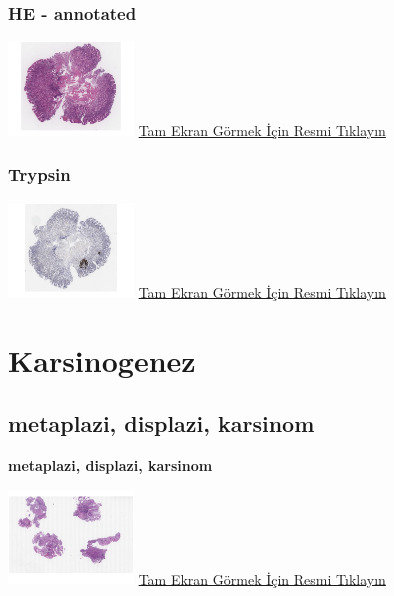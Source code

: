 \documentclass[
  letterpaper,
  DIV=11,
  numbers=noendperiod]{scrreprt}
\begin{document}
\hypertarget{he---annotated}{%
\subsection{HE - annotated}\label{he---annotated}}

\href{https://images.patolojiatlasi.com/metaplasia/HE_annotated.html}{\includegraphics[width=0.25\textwidth,height=\textheight]{./screenshots/thumbnail_metaplasia.png}}
\href{https://images.patolojiatlasi.com/metaplasia/HE_annotated.html}{Tam
Ekran Görmek İçin Resmi Tıklayın}

\hypertarget{trypsin}{%
\subsection{Trypsin}\label{trypsin}}

\href{https://images.patolojiatlasi.com/metaplasia/trypsin.html}{\includegraphics[width=0.25\textwidth,height=\textheight]{./screenshots/thumbnail_metaplasia-trypsin.png}}
\href{https://images.patolojiatlasi.com/metaplasia/trypsin.html}{Tam
Ekran Görmek İçin Resmi Tıklayın}

\hypertarget{sec-karsinogenez}{%
\chapter{Karsinogenez}\label{sec-karsinogenez}}

\hypertarget{sec-mepaplazi-displazi-karsinom}{%
\section{metaplazi, displazi,
karsinom}\label{sec-mepaplazi-displazi-karsinom}}

\textbf{metaplazi, displazi, karsinom}

\href{https://images.patolojiatlasi.com/carcinogenesis/HE.html}{\includegraphics[width=0.25\textwidth,height=\textheight]{./screenshots/thumbnail_carcinogenesis.png}}
\href{https://images.patolojiatlasi.com/carcinogenesis/HE.html}{Tam
Ekran Görmek İçin Resmi Tıklayın}
\end{document}
